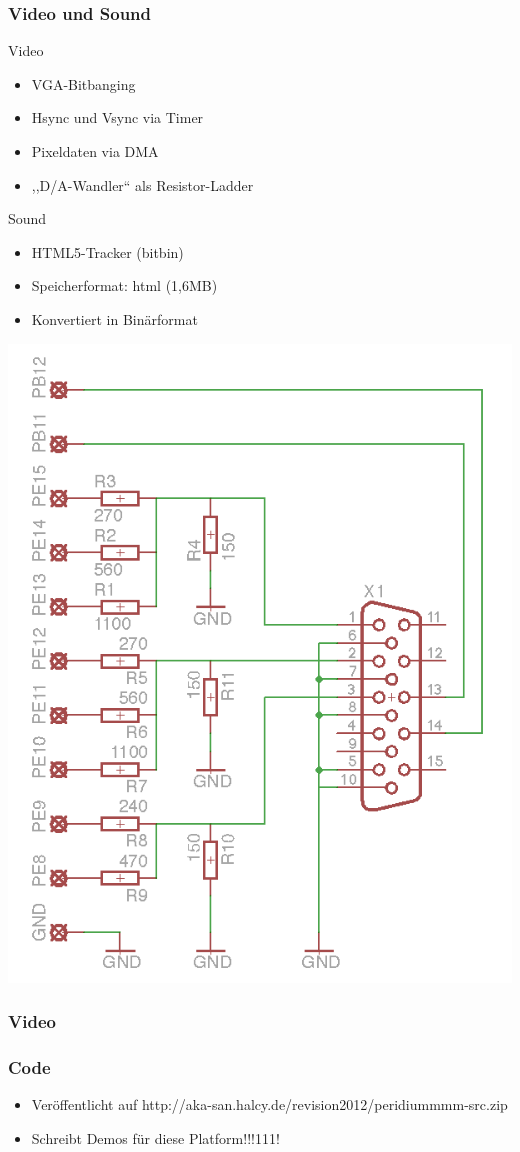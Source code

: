 \documentclass[t,14pt,aspectratio=169]{beamer}
\begin{document}
\begin{frame} %
\frametitle{Video und Sound}

\begin{minipage}{0.6\linewidth}
Video
\begin{itemize}
\item VGA-Bitbanging
\item Hsync und Vsync via Timer
\item Pixeldaten via DMA
\item ,,D/A-Wandler`` als Resistor-Ladder
\end{itemize}
Sound
\begin{itemize}
\item HTML5-Tracker (bitbin)
\item Speicherformat: html (1,6MB)
\item Konvertiert in Binärformat
\end{itemize}
\end{minipage}
\begin{minipage}{0.35\linewidth}
\includegraphics[width=\linewidth]{photos/schematic}
\end{minipage}
\end{frame}


\begin{frame}
\frametitle{Video}
\end{frame}

\begin{frame}
\frametitle{Code}
\begin{itemize}
\item Veröffentlicht auf http://aka-san.halcy.de/revision2012/peridiummmm-src.zip
\item Schreibt Demos für diese Platform!!!111!
\end{itemize}
\end{frame}
\end{document}
